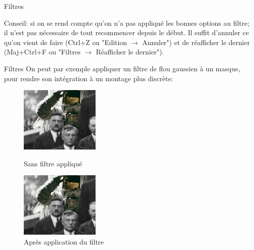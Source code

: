 \begin{frame}{Filtres}
\begin{overprint}
\begin{enumerate}
{						Conseil: si on se rend compte qu'on n'a pas appliqué les bonnes options au filtre; il n'est pas nécessaire de tout recommencer depuis le début. Il suffit d'annuler ce qu'on vient de faire (Ctrl+Z ou "Edition $\rightarrow$ Annuler") et de réafficher le dernier (Maj+Ctrl+F ou "Filtres $\rightarrow$ Réafficher le dernier").
			}
		\end{enumerate}
		\end{overprint}
	\end{frame}

\begin{frame}{Filtres}
		On peut par exemple appliquer un filtre de flou gaussien à un masque, pour rendre son intégration à un montage plus discrète:
		\begin{figure}[H]
			\centering
			\begin{minipage}{.5\textwidth}
				\centering
				\includegraphics[height=120px]{Images/filters/astro0}
				\caption{Sans filtre appliqué}
			\end{minipage}%
			\begin{minipage}{.5\textwidth}
				\centering
				\includegraphics[height=120px]{Images/filters/astro1}
				\caption{Après application du filtre}
			\end{minipage}
		\end{figure}
\end{frame}


